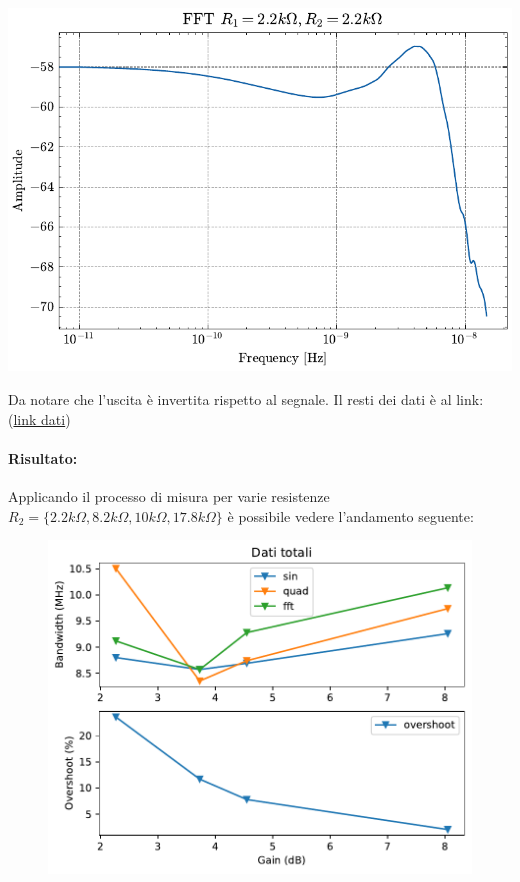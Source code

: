 \begin{minipage}{0.8\textwidth}
\begin{minipage}[b]{0.3\textwidth}
        \includegraphics[width=\linewidth]{analog/assets/OP27/Invertente/FFT_17k8.pdf}
    \end{minipage}
    \hfill    
\end{minipage}

Da notare che l'uscita è invertita rispetto al segnale. Il resti dei dati è al link: (\href{https://github.com/Yedi278/Esperimentazioni-Elettronica/tree/main/-\%20OPAMP/OP27/Invertente}{link dati})

\paragraph{Risultato:}
Applicando il processo di misura per varie resistenze $R_2 = \{ 2.2k\Omega, 8.2k\Omega, 10k\Omega, 17.8k\Omega \}$ è possibile vedere l'andamento seguente:

\begin{figure}[!h]
    \centering
    \includegraphics[width=.5\linewidth]{analog/assets/OP27/Invertente/OP27_Invert_Dati_tot.pdf}
\end{figure}

